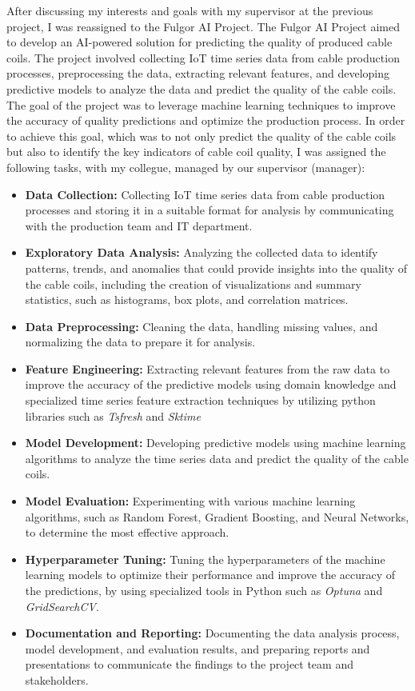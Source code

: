 After discussing my interests and goals with my supervisor at the previous
project, I was reassigned to the Fulgor AI Project. The Fulgor AI Project aimed
to develop an AI-powered solution for predicting the quality of produced cable
coils. The project involved collecting IoT time series data from cable
production processes, preprocessing the data, extracting relevant features, and
developing predictive models to analyze the data and predict the quality of the
cable coils. The goal of the project was to leverage machine learning
techniques to improve the accuracy of quality predictions and optimize the
production process. In order to achieve this goal, which was to not only
predict the quality of the cable coils but also to identify the key indicators
of cable coil quality, I was assigned the following tasks, with my collegue,
managed by our supervisor (manager):
\begin{itemize}
    \item \textbf{Data Collection:} Collecting IoT time series data from cable production processes and storing it in a suitable format for analysis by communicating with the production team and IT department.
    \item \textbf{Exploratory Data Analysis:} Analyzing the collected data to identify patterns, trends, and anomalies that could provide insights into the quality of the cable coils, including the creation of visualizations and summary statistics, such as histograms, box plots, and correlation matrices.
    \item \textbf{Data Preprocessing:} Cleaning the data, handling missing values, and normalizing the data to prepare it for analysis.
    \item \textbf{Feature Engineering:} Extracting relevant features from the raw data to improve the accuracy of the predictive models using domain knowledge and specialized time series feature extraction techniques by utilizing python libraries such as \emph{Tsfresh} and \emph{Sktime}
    \item \textbf{Model Development:} Developing predictive models using machine learning algorithms to analyze the time series data and predict the quality of the cable coils.
    \item \textbf{Model Evaluation:} Experimenting with various machine learning algorithms, such as Random Forest, Gradient Boosting, and Neural Networks, to determine the most effective approach.
    \item \textbf{Hyperparameter Tuning:} Tuning the hyperparameters of the machine learning models to optimize their performance and improve the accuracy of the predictions, by using specialized tools in Python such as \emph{Optuna} and \emph{GridSearchCV}.
    \item \textbf{Documentation and Reporting:} Documenting the data analysis process, model development, and evaluation results, and preparing reports and presentations to communicate the findings to the project team and stakeholders.
\end{itemize}
